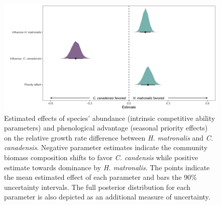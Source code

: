 \documentclass{article}[11pt]
\begin{document}
{{\begin{figure}[h!]
    \centering
\includegraphics[width=\textwidth]{..//figure/mu_plots.jpeg}
    \caption{Estimated effects of species' abundance (intrinsic competitive ability parameters) and phenological advantage (seasonal priority effects) on the relative growth rate difference between \textit{H. matronalis} and \textit{C. canadensis}. Negative parameter estimates indicate the community biomass composition shifts to favor \textit{C. candensis} while positive estimate towards dominance by \textit{ H. matronalis}. The points indicate the mean estimated effect of each parameter and bars the 90\% uncertainty intervals. The full posterior distribution for each parameter is also depicted as an additional measure of uncertainty.} 
    \label{fig:RGRD}
\end{figure}


}}
\end{document}
